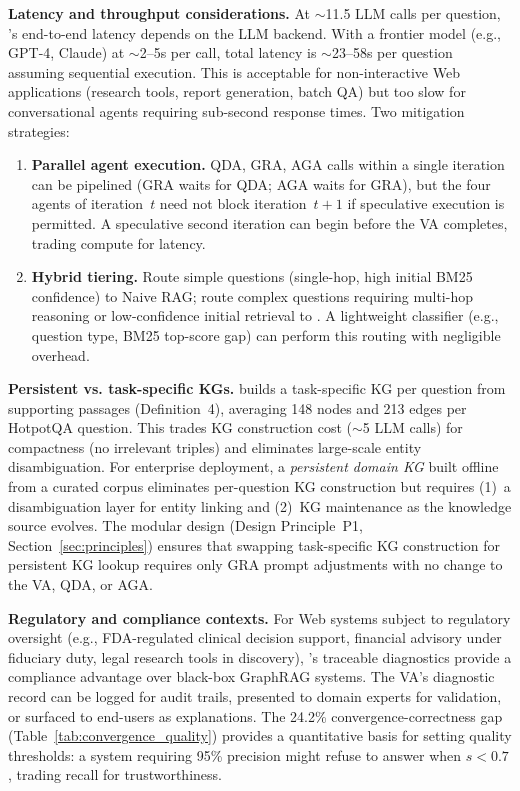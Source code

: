 \smallskip
\noindent\textbf{Latency and throughput considerations.}
At $\sim$11.5 LLM calls per question, \sys's end-to-end latency depends on the
LLM backend. With a frontier model (e.g., GPT-4, Claude) at $\sim$2--5s per call,
total latency is $\sim$23--58s per question assuming sequential execution. This
is acceptable for non-interactive Web applications (research tools, report
generation, batch QA) but too slow for conversational agents requiring
sub-second response times. Two mitigation strategies:
\begin{enumerate}
  \item \textbf{Parallel agent execution.} QDA, GRA, AGA calls within a single
        iteration can be pipelined (GRA waits for QDA; AGA waits for GRA), but
        the four agents of iteration~$t$ need not block iteration~$t{+}1$ if
        speculative execution is permitted. A speculative second iteration can
        begin before the VA completes, trading compute for latency.

  \item \textbf{Hybrid tiering.} Route simple questions (single-hop, high
        initial BM25 confidence) to Naive RAG; route complex questions requiring
        multi-hop reasoning or low-confidence initial retrieval to \sys. A
        lightweight classifier (e.g., question type, BM25 top-score gap) can
        perform this routing with negligible overhead.
\end{enumerate}

\smallskip
\noindent\textbf{Persistent vs. task-specific KGs.}
\sys builds a task-specific KG per question from supporting passages
(Definition~4), averaging 148 nodes and 213 edges per HotpotQA question. This
trades KG construction cost ($\sim$5 LLM calls) for compactness (no irrelevant
triples) and eliminates large-scale entity disambiguation. For enterprise
deployment, a \emph{persistent domain KG} built offline from a curated corpus
eliminates per-question KG construction but requires (1)~a disambiguation layer
for entity linking and (2)~KG maintenance as the knowledge source evolves. The
modular design (Design Principle~P1, Section~\ref{sec:principles}) ensures that
swapping task-specific KG construction for persistent KG lookup requires only
GRA prompt adjustments with no change to the VA, QDA, or AGA.

\smallskip
\noindent\textbf{Regulatory and compliance contexts.}
For Web systems subject to regulatory oversight (e.g., FDA-regulated clinical
decision support, financial advisory under fiduciary duty, legal research tools
in discovery), \sys's traceable diagnostics provide a compliance advantage over
black-box GraphRAG systems. The VA's diagnostic record can be logged for audit
trails, presented to domain experts for validation, or surfaced to end-users as
explanations. The 24.2\% convergence-correctness gap (Table~\ref{tab:convergence_quality})
provides a quantitative basis for setting quality thresholds: a system requiring
95\% precision might refuse to answer when $s < 0.7$, trading recall for
trustworthiness.

